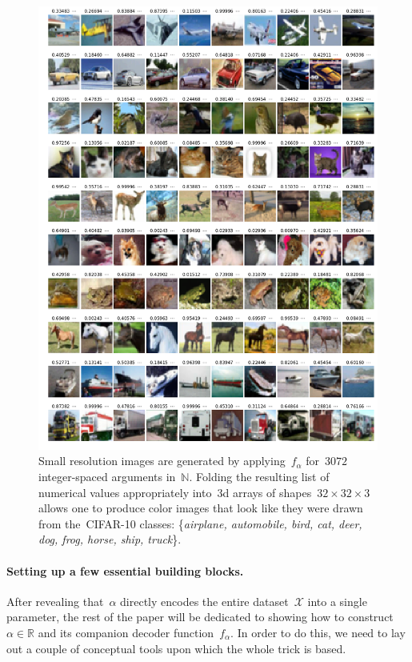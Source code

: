 \documentclass{article}
\begin{document}
\begin{figure}
\centering
\includegraphics[width=\linewidth]{resources/cifar10/CIFAR10-generatedImgs.png}
\caption[]{Small resolution images are generated by applying~$f_\alpha$ for~$3072$ integer-spaced arguments in~$\mathbb{N}$.  Folding the resulting list of numerical values appropriately into~$3$d arrays of shapes~$32\times 32\times 3$ allows one to produce color images that look like they were drawn from the~CIFAR-10 classes: \{{\it airplane, automobile, bird, cat, deer, dog, frog, horse, ship, truck}\}.}
\label{fig::cifar10}
\end{figure}

\paragraph{Setting up a few essential building blocks.}  After revealing that~$\alpha$ directly encodes the entire dataset~$\mathcal{X}$ into a single parameter, the rest of the paper will be dedicated to showing how to construct~$\alpha \in \mathbb{R}$ and its companion decoder function~$f_\alpha$.  In order to do this, we need to lay out a couple of conceptual tools upon which the whole trick is based.
\end{document}
